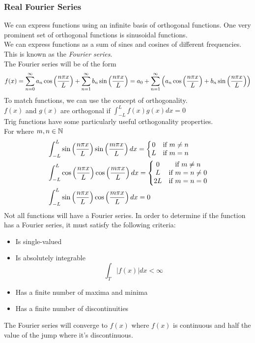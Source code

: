 \documentclass[11pt, fleqn]{article}
\begin{document}
\subsubsection{Real Fourier Series}
We can express functions using an infinite basis of orthogonal functions. One very prominent set of orthogonal functions is sinusoidal functions.\\
We can express functions as a sum of sines and cosines of different frequencies. This is known as the \textit{Fourier series}.\\
The Fourier series will be of the form
$$f(x)=\sum_{n=0}^\infty a_n\cos\left( \frac{n\pi x}{L} \right)+\sum_{n=1}^\infty b_n\sin\left( \frac{n\pi x}{L} \right)=a_0+\sum_{n=1}^\infty\left( a_n\cos\left( \frac{n\pi x}{L} \right)+b_n\sin\left( \frac{n\pi x}{L} \right) \right)$$
To match functions, we can use the concept of orthogonality.\\
$f(x)$ and $g(x)$ are orthogonal if $\displaystyle{\int_{-L}^Lf(x)g(x)dx=0}$\\
Trig functions have some particularly useful orthogonality properties.\\
For where $m,n\in\mathbb{N}$
\begin{align*}
    &\int_{-L}^L\sin\left( \frac{n\pi x}{L} \right)\sin\left( \frac{m\pi x}{L} \right)dx=\left\{\begin{matrix} 0 & \text{if }m\neq n\\ L & \text{if }m=n \end{matrix}\right.\\
    &\int_{-L}^L\cos\left( \frac{n\pi x}{L} \right)\cos\left( \frac{m\pi x}{L} \right)dx=\left\{\begin{matrix} 0 & \text{if }m\neq n\\ L & \text{if }m=n\neq 0\\ 2L & \text{if }m=n=0 \end{matrix}\right.\\
    &\int_{-L}^L\sin\left( \frac{n\pi x}{L} \right)\cos\left( \frac{m\pi x}{L} \right)dx=0
\end{align*}
Not all functions will have a Fourier series. In order to determine if the function has a Fourier series, it must satisfy the following criteria:
\begin{itemize}
    \item Is single-valued
    \item Is absolutely integrable
    \[ \int_T|f(x)|dx<\infty \]
    \item Has a finite number of maxima and minima
    \item Has a finite number of discontinuities
\end{itemize}
The Fourier series will converge to $f(x)$ where $f(x)$ is continuous and half the value of the jump where it's discontinuous.\\
\end{document}
